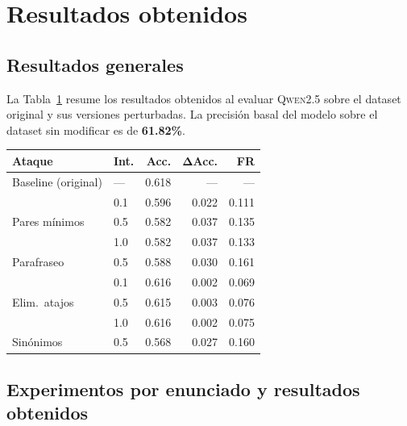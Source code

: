 \documentclass[11pt]{article}
\begin{document}
\section{Resultados obtenidos}
\label{sec:results}

\subsection{Resultados generales}
\label{sec:results-general}

La Tabla~\ref{tab:results} resume los resultados obtenidos al evaluar
\textsc{Qwen2.5} sobre el dataset original y sus versiones perturbadas.
La precisión basal del modelo sobre el dataset sin modificar es de
\textbf{61.82\%}.

\begin{table}[h]
  \centering
  \small
  \begin{tabular}{llrrr}
    \toprule
    \textbf{Ataque} & \textbf{Int.} & \textbf{Acc.} & $\boldsymbol{\Delta}$\textbf{Acc.} & \textbf{FR} \\
    \midrule
    Baseline (original) & --- & 0.618 & --- & --- \\
    \midrule
    \multirow{3}{*}{Pares mínimos}   & 0.1 & 0.596 & 0.022 & 0.111 \\
                                      & 0.5 & 0.582 & 0.037 & 0.135 \\
                                      & 1.0 & 0.582 & 0.037 & 0.133 \\
    \midrule
    Parafraseo                        & 0.5 & 0.588 & 0.030 & 0.161 \\
    \midrule
    \multirow{3}{*}{Elim.\ atajos}   & 0.1 & 0.616 & 0.002 & 0.069 \\
                                      & 0.5 & 0.615 & 0.003 & 0.076 \\
                                      & 1.0 & 0.616 & 0.002 & 0.075 \\
    \midrule
    Sinónimos                         & 0.5 & 0.568 & 0.027 & 0.160 \\
    \bottomrule
  \end{tabular}
  \label{tab:results}
\end{table}

\subsection{Experimentos por enunciado y resultados obtenidos}
\label{sec:results-per-task}
\end{document}
